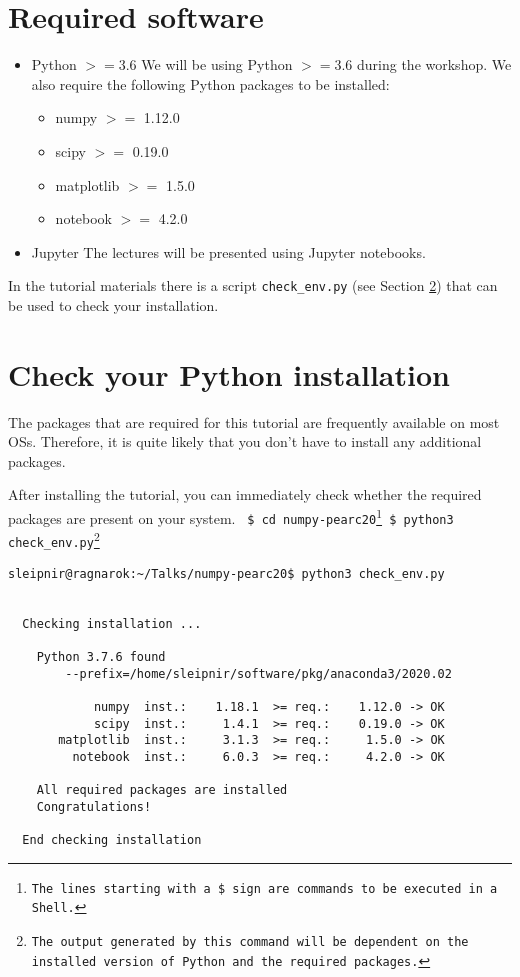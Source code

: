 \documentclass[11pt]{article}
\begin{document}
\section{Required software}
\begin{itemize}
  \item Python $>=3.6$ \newline
        We will be using Python $>=3.6$ during the workshop.
        We also require the following Python packages to be installed:
        \begin{itemize}
           \item numpy $>=$ 1.12.0 
           \item scipy $>=$ 0.19.0
           \item matplotlib $>=$ 1.5.0
           \item notebook $>=$ 4.2.0
        \end{itemize} 

  \item Jupyter \newline
        The lectures will be presented using Jupyter notebooks.
\end{itemize}

In the tutorial materials there is a script \texttt{check\_env.py} 
(see Section \ref{section:check}) that can be used to check your installation.


\section{Check your Python installation}\label{section:check}
The packages that are required for this tutorial are frequently available 
on most OSs.
Therefore, it is quite likely that you don't have to install any additional packages.

After installing the tutorial, you can immediately check whether the required packages 
are present on your system. \newline\newline
\texttt{
\$ cd numpy-pearc20\footnote{The lines starting with a \$ sign are commands to be executed in a Shell.} \newline
\$ python3 check\_env.py\footnote{The output generated by this command will be dependent on the installed version of Python and the required packages.}\newline
}

\begin{verbatim}
sleipnir@ragnarok:~/Talks/numpy-pearc20$ python3 check_env.py


  Checking installation ...

    Python 3.7.6 found
        --prefix=/home/sleipnir/software/pkg/anaconda3/2020.02

            numpy  inst.:    1.18.1  >= req.:    1.12.0 -> OK 
            scipy  inst.:     1.4.1  >= req.:    0.19.0 -> OK 
       matplotlib  inst.:     3.1.3  >= req.:     1.5.0 -> OK 
         notebook  inst.:     6.0.3  >= req.:     4.2.0 -> OK 

    All required packages are installed
    Congratulations!

  End checking installation
\end{verbatim}  
\end{document}

